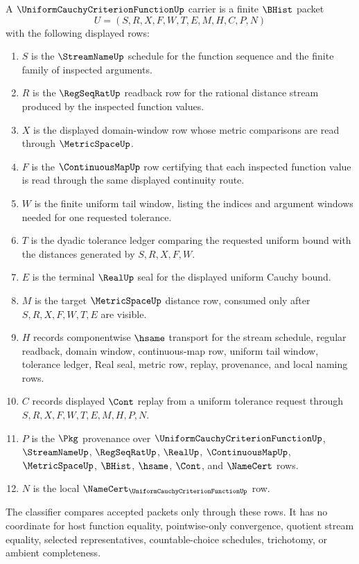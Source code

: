 \begin{definition}
\label{def:uniform-cauchy-criterion-function-carrier}
A $\UniformCauchyCriterionFunctionUp$ carrier is a finite $\BHist$ packet
$$
U=(S,R,X,F,W,T,E,M,H,C,P,N)
$$
with the following displayed rows:
\begin{enumerate}
\item $S$ is the $\StreamNameUp$ schedule for the function sequence and the finite family of inspected arguments.
\item $R$ is the $\RegSeqRatUp$ readback row for the rational distance stream produced by the inspected function values.
\item $X$ is the displayed domain-window row whose metric comparisons are read through $\MetricSpaceUp$.
\item $F$ is the $\ContinuousMapUp$ row certifying that each inspected function value is read through the same displayed continuity route.
\item $W$ is the finite uniform tail window, listing the indices and argument windows needed for one requested tolerance.
\item $T$ is the dyadic tolerance ledger comparing the requested uniform bound with the distances generated by $S,R,X,F,W$.
\item $E$ is the terminal $\RealUp$ seal for the displayed uniform Cauchy bound.
\item $M$ is the target $\MetricSpaceUp$ distance row, consumed only after $S,R,X,F,W,T,E$ are visible.
\item $H$ records componentwise $\hsame$ transport for the stream schedule, regular readback, domain window, continuous-map row, uniform tail window, tolerance ledger, Real seal, metric row, replay, provenance, and local naming rows.
\item $C$ records displayed $\Cont$ replay from a uniform tolerance request through $S,R,X,F,W,T,E,M,H,P,N$.
\item $P$ is the $\Pkg$ provenance over $\UniformCauchyCriterionFunctionUp$, $\StreamNameUp$, $\RegSeqRatUp$, $\RealUp$, $\ContinuousMapUp$, $\MetricSpaceUp$, $\BHist$, $\hsame$, $\Cont$, and $\NameCert$ rows.
\item $N$ is the local $\NameCert_{\UniformCauchyCriterionFunctionUp}$ row.
\end{enumerate}
The classifier compares accepted packets only through these rows. It has no coordinate for host function equality, pointwise-only convergence, quotient stream equality, selected representatives, countable-choice schedules, trichotomy, or ambient completeness.
\end{definition}

